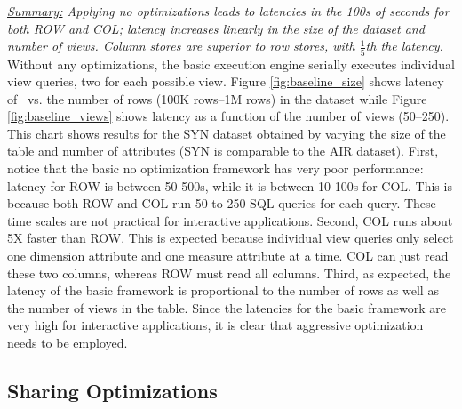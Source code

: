 {\em \underline{Summary:} Applying no optimizations 
leads to latencies in the 100s of seconds for both ROW and COL;
latency increases linearly in the size of the dataset and  number
of views. 
Column stores are superior to row stores,
with $\frac{1}{5}$th the latency.}
Without any optimizations, the basic \SeeDB execution engine
serially executes individual view queries, two for each possible view.
Figure \ref{fig:baseline_size} shows latency of \SeeDB\ vs. the number of rows (100K rows--1M rows) in the dataset while  
Figure \ref{fig:baseline_views} shows latency as a function 
of the number of views (50--250).
This chart shows results for the SYN dataset obtained by varying the size of the
table and number of attributes (SYN is comparable to the AIR dataset).
First, notice that the basic no optimization framework has very 
poor performance: latency for ROW is between 50-500s, 
while it is between 10-100s for COL. 
This is because both ROW and COL run 50 to 250 SQL queries for each \SeeDB query.
These time scales are not practical for interactive applications. 
Second, COL runs about 5X faster than ROW. 
This is expected because individual view queries only select one dimension
attribute and one measure attribute at a time.  
COL can just read these two
columns, whereas ROW must read all columns.
Third, as expected, the latency of the
basic framework is proportional to the number of rows as well as the 
number of views in the table.
Since the latencies for the basic framework are very high for interactive
applications, it is clear that aggressive optimization needs to be employed.

\subsection{Sharing Optimizations}
\label{sec:expts_dbms_execution_engine}

